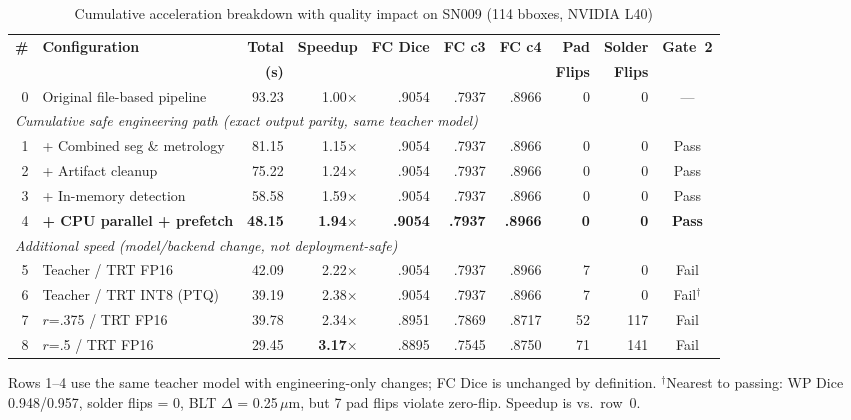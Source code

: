 \begin{table}[H]
\centering
\caption{Cumulative acceleration breakdown with quality impact on SN009 (114 bboxes, NVIDIA L40)}
\label{tab:speedup-breakdown}
\begin{adjustbox}{max width=\textwidth}
\renewcommand{\arraystretch}{1.2}
\scriptsize
{}
\begin{tabular}{r l | rr | rrr | rr | c}
\toprule
\textbf{\#} & \textbf{Configuration}
  & \textbf{Total} & \textbf{Speedup}
  & \textbf{FC Dice} & \textbf{FC c3} & \textbf{FC c4}
  & \textbf{Pad} & \textbf{Solder}
  & \textbf{Gate~2} \\
& & \textbf{(s)} & & & & & \textbf{Flips} & \textbf{Flips} & \\
\midrule
0 & Original file-based pipeline  & 93.23 & 1.00$\times$ & .9054 & .7937 & .8966 & 0 & 0 & --- \\
\midrule
\multicolumn{10}{l}{\textit{Cumulative safe engineering path (exact output parity, same teacher model)}} \\
1 & + Combined seg \& metrology    & 81.15 & 1.15$\times$ & .9054 & .7937 & .8966 & 0 & 0 & Pass \\
2 & + Artifact cleanup             & 75.22 & 1.24$\times$ & .9054 & .7937 & .8966 & 0 & 0 & Pass \\
3 & + In-memory detection          & 58.58 & 1.59$\times$ & .9054 & .7937 & .8966 & 0 & 0 & Pass \\
4 & \textbf{+ CPU parallel + prefetch} & \textbf{48.15} & \textbf{1.94$\times$} & \textbf{.9054} & \textbf{.7937} & \textbf{.8966} & \textbf{0} & \textbf{0} & \textbf{Pass} \\
\midrule
\multicolumn{10}{l}{\textit{Additional speed (model/backend change, not deployment-safe)}} \\
5 & Teacher / TRT FP16             & 42.09 & 2.22$\times$ & .9054 & .7937 & .8966 & 7 & 0 & Fail \\
6 & Teacher / TRT INT8 (PTQ)       & 39.19 & 2.38$\times$ & .9054 & .7937 & .8966 & 7 & 0 & Fail$^\dagger$ \\
7 & $r$=.375 / TRT FP16            & 39.78 & 2.34$\times$ & .8951 & .7869 & .8717 & 52 & 117 & Fail \\
8 & $r$=.5 / TRT FP16              & 29.45 & \textbf{3.17$\times$} & .8895 & .7545 & .8750 & 71 & 141 & Fail \\
\bottomrule
\end{tabular}
\end{adjustbox}

\smallskip
{\footnotesize Rows 1--4 use the same teacher model with engineering-only changes; FC Dice is unchanged by definition. $^\dagger$Nearest to passing: WP Dice 0.948/0.957, solder flips = 0, BLT $\Delta$ = 0.25\,$\mu$m, but 7 pad flips violate zero-flip. Speedup is vs.\ row~0.}
\end{table}


